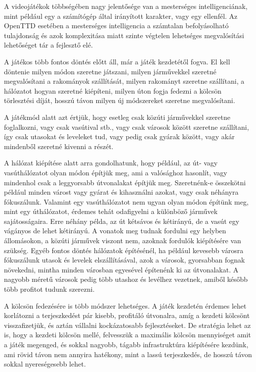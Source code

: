 A videojátékok többségében nagy jelentősége van a mesterséges intelligenciának, mint például egy a számítógép által irányított karakter, vagy egy ellenfél. Az OpenTTD esetében a mesterséges intelligencia a számtalan befolyásolható tulajdonság és azok komplexitása miatt szinte végtelen lehetséges megvalósítási lehetőséget tár a fejlesztő elé. 


A játékos több fontos döntés előtt áll, már a játék kezdetétől fogva. El kell döntenie milyen módon szeretne játszani, milyen járművekkel szeretné megvalósítani a rakományok szállítását, milyen rakományt szeretne szállítani, a hálózatot hogyan szeretné kiépíteni, milyen úton fogja fedezni a kölcsön törlesztési díját, hosszú távon milyen új módszereket szeretne megvalósítani.

A játékmód alatt azt értjük, hogy esetleg csak közúti járművekkel szeretne foglalkozni, vagy csak vasútival stb., vagy csak városok között szeretne szállítani, így csak utasokat és leveleket tud, vagy pedig csak gyárak között, vagy akár mindenből szeretné kivenni a részét.

A hálózat kiépítése alatt arra gondolhatunk, hogy például, az út- vagy vasúthálózatot olyan módon építjük meg, ami a valósághoz hasonlít, vagy mindenhol csak a leggyorsabb útvonalakat építjük meg. Szeretnénk-e összekötni például minden várost vagy gyárat és kihasználni azokat, vagy csak néhányra fókuszálunk. Valamint egy vasúthálózatot nem ugyan olyan módon építünk meg, mint egy úthálózatot, érdemes tehát odafigyelni a különböző járművek sajátosságaira. Erre néhány példa, az út kétsávos és kétirányú, de a vasút egy vágányos de lehet kétirányú. A vonatok meg tudnak fordulni egy helyben állomásokon, a közúti járművek viszont nem, azoknak fordulók kiépítésére van szükség. Egyéb fontos döntés hálózatok építésénél, ha például kevesebb városra fókuszálunk utasok és levelek elszállításával, azok a városok, gyorsabban fognak növekedni, mintha minden városban egyesével építenénk ki az útvonalakat. A nagyobb méretű városok pedig több utashoz és levélhez vezetnek, amiből később több profitot tudunk szerezni.

A kölcsön fedezésére is több módszer lehetséges. A játék kezdetén érdemes lehet korlátozni a terjeszkedést pár kisebb, profitáló útvonalra, amíg a kezdeti kölcsönt visszafizetjük, és aztán vállalni kockázatosabb fejlesztéseket. De stratégia lehet az is, hogy a kezdeti kölcsön mellé, felvesszük a maximális kölcsön mennyiséget amit a játék megenged, és sokkal nagyobb, tágabb infrastruktúra kiépítésére kezdünk, ami rövid távon nem annyira hatékony, mint a lassú terjeszkedés, de hosszú távon sokkal nyereségesebb lehet.

